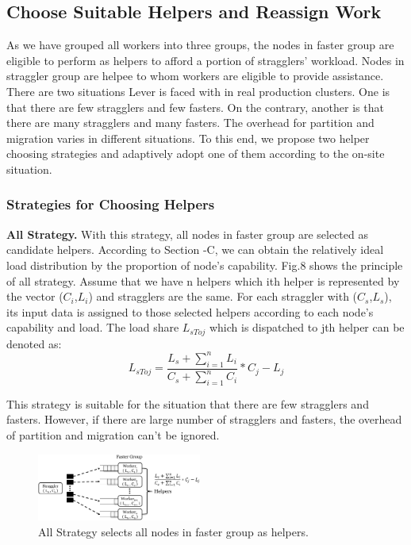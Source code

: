\subsection{Choose Suitable Helpers and Reassign Work}

  As we have grouped all workers into three groups, the nodes in faster group are eligible to perform as helpers to afford a portion of stragglers' workload. Nodes in straggler group are helpee to whom workers are eligible to provide assistance. There are two situations Lever is faced with in real production clusters. One is that there are few stragglers and few fasters. On the contrary, another is that there are many stragglers and many fasters. The overhead for partition and migration varies in different situations. To this end, we propose two helper choosing strategies and adaptively adopt one of them according to the on-site situation.

\subsubsection{Strategies for Choosing Helpers}

  \textbf{All Strategy.} With this strategy, all nodes in faster group are selected as candidate helpers. According to Section \uppercase\expandafter{}-C, we can obtain the relatively ideal load distribution by the proportion of node's capability. Fig.8 shows the principle of all strategy. Assume that we have n helpers which ith helper is represented by the vector (\emph{$C_i$},\emph{$L_i$}) and stragglers are the same. For each straggler with (\emph{$C_s$},\emph{$L_s$}), its input data is assigned to those selected helpers according to each node's capability and load. The load share \emph{{$L_{sToj}$}} which is dispatched to jth helper can be denoted as:
  \begin{equation}
  L_{sToj} = \frac{L_s + \sum_{i=1}^n L_i}{C_s + \sum_{i=1}^n C_i}*C_j - L_j
  \end{equation}

  This strategy is suitable for the situation that there are few stragglers and fasters. However, if there are large number of stragglers and fasters, the overhead of partition and migration can't be ignored.
  \begin{figure}[htbp]
    \centering
    \includegraphics[width=0.48\textwidth]{FigureS1}
    \caption{All Strategy selects all nodes in faster group as helpers.}
    \label{Fig. 8:}
  \end{figure}

